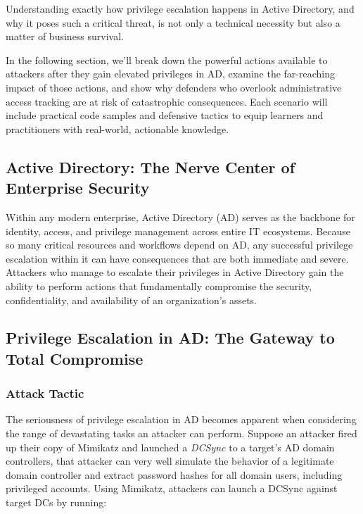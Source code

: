Understanding exactly how privilege escalation happens in Active Directory, and why it poses such a critical threat, is not only a technical necessity but also a matter of business survival.

In the following section, we’ll break down the powerful actions available to attackers after they gain elevated privileges in AD, examine the far-reaching impact of those actions, and show why defenders who overlook administrative access tracking are at risk of catastrophic consequences. Each scenario will include practical code samples and defensive tactics to equip learners and practitioners with real-world, actionable knowledge.

\subsection{\textbf{Active Directory: The Nerve Center of Enterprise Security}}

Within any modern enterprise, Active Directory (AD) serves as the backbone for identity, access, and privilege management across entire IT ecosystems. Because so many critical resources and workflows depend on AD, any successful privilege escalation within it can have consequences that are both immediate and severe. Attackers who manage to escalate their privileges in Active Directory gain the ability to perform actions that fundamentally compromise the security, confidentiality, and availability of an organization’s assets.

\subsection{\textbf{Privilege Escalation in AD: The Gateway to Total Compromise}}

\subsubsection{Attack Tactic}

The seriousness of privilege escalation in AD becomes apparent when considering the range of devastating tasks an attacker can perform. Suppose an attacker fired up their copy of Mimikatz and launched a \textit{DCSync }to a target’s AD domain controllers, that attacker can very well simulate the behavior of a legitimate domain controller and extract password hashes for all domain users, including privileged accounts. Using Mimikatz, attackers can launch a DCSync against target DCs by running:

